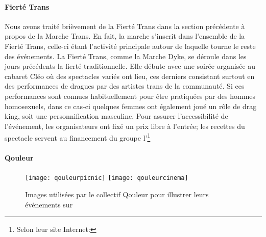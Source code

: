 \paragraph{Fierté Trans}
\label{subsec:fiertetrans}
Nous avons traité brièvement de la Fierté Trans dans la section précédente à propos de la Marche Trans.
En fait, la marche s'inscrit dans l'ensemble de la Fierté Trans, celle-ci étant l'activité principale autour de laquelle tourne le reste des événements.
La Fierté Trans, comme la Marche Dyke, se déroule dans les jours précédents la fierté traditionnelle.
Elle débute avec une soirée organisée au cabaret Cléo où des spectacles variés ont lieu, ces derniers consistant surtout en des performances de dragues par des artistes trans de la communauté.
Si ces performances sont connues habituellement pour être pratiquées par des hommes homosexuels, dans ce cas-ci quelques femmes ont également joué un rôle de drag king, soit une personnification masculine.
Pour assurer l'accessibilité de l'événement, les organisateurs ont fixé un prix libre à l'entrée; les recettes du spectacle servent au financement du groupe l'\astteq{}\footnote{Selon leur site Internet: }

\paragraph{Qouleur}
\label{subsec:qouleur}

\begin{figure}
 \centering
 {\texttt{[image: qouleurpicnic]}}
 {\texttt{[image: qouleurcinema]}}
 \caption[Exemples d'images utilisées par Qouleur]{Images utilisées par le collectif Qouleur pour illustrer leurs événements sur }\label{figs:qouleurcinema}
\end{figure}

